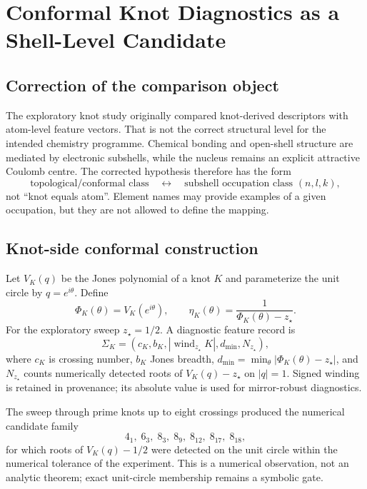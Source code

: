 \chapter{Conformal Knot Diagnostics as a Shell-Level Candidate}
\label{ch:knot-shell-diagnostics}

\section{Correction of the comparison object}
The exploratory knot study originally compared knot-derived descriptors with atom-level feature vectors.  That is not the correct structural level for the intended chemistry programme.  Chemical bonding and open-shell structure are mediated by electronic subshells, while the nucleus remains an explicit attractive Coulomb centre.  The corrected hypothesis therefore has the form
\begin{equation}
\text{topological/conformal class}\quad\longleftrightarrow\quad\text{subshell occupation class }(n,l,k),
\end{equation}
not ``knot equals atom''.  Element names may provide examples of a given occupation, but they are not allowed to define the mapping.

\section{Knot-side conformal construction}
Let $V_K(q)$ be the Jones polynomial of a knot $K$ and parameterize the unit circle by $q=e^{i\theta}$.  Define
\begin{equation}
\Phi_K(\theta)=V_K(e^{i\theta}),\qquad
\eta_K(\theta)=\frac{1}{\Phi_K(\theta)-z_\star}.
\end{equation}
For the exploratory sweep $z_\star=1/2$.  A diagnostic feature record is
\begin{equation}
\Sigma_K=\left(c_K,b_K,|\operatorname{wind}_{z_\star}K|,d_{\min},N_{z_\star}\right),
\end{equation}
where $c_K$ is crossing number, $b_K$ Jones breadth, $d_{\min}=\min_\theta|\Phi_K(\theta)-z_\star|$, and $N_{z_\star}$ counts numerically detected roots of $V_K(q)-z_\star$ on $|q|=1$.  Signed winding is retained in provenance; its absolute value is used for mirror-robust diagnostics.

The sweep through prime knots up to eight crossings produced the numerical candidate family
\begin{equation}
4_1,\;6_3,\;8_3,\;8_9,\;8_{12},\;8_{17},\;8_{18},
\end{equation}
for which roots of $V_K(q)-1/2$ were detected on the unit circle within the numerical tolerance of the experiment.  This is a numerical observation, not an analytic theorem; exact unit-circle membership remains a symbolic gate.


